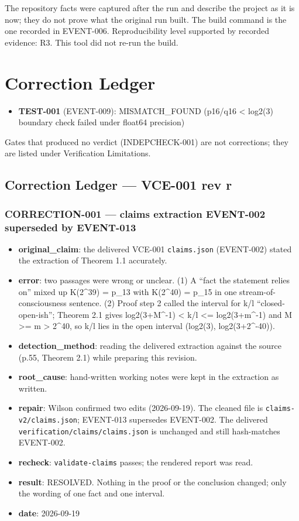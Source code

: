 \documentclass[11pt]{article}
\begin{document}
The repository facts were captured after the run and describe the project as it is now; they do not prove what the original run built. The build command is the one recorded in EVENT-006.
Reproducibility level supported by recorded evidence: R3. This tool did not re-run the build.
\section{Correction Ledger}
\begin{itemize}
\item \textbf{TEST-001} (EVENT-009): MISMATCH\_FOUND (p16/q16 < log2(3) boundary check failed under float64 precision)
\end{itemize}
Gates that produced no verdict (INDEPCHECK-001) are not corrections; they are listed under Verification Limitations.
\subsection*{Correction Ledger --- VCE-001 rev r}
\subsubsection*{CORRECTION-001 --- claims extraction EVENT-002 superseded by EVENT-013}
\begin{itemize}
\item \textbf{original\_claim}: the delivered VCE-001 \texttt{claims.json} (EVENT-002) stated the extraction of Theorem 1.1 accurately.
\item \textbf{error}: two passages were wrong or unclear. (1) A ``fact the statement relies on'' mixed up K(2\textasciicircum{}39) = p\_13 with K(2\textasciicircum{}40) = p\_15 in one stream-of-consciousness sentence. (2) Proof step 2 called the interval for k/l ``closed-open-ish''; Theorem 2.1 gives log2(3+M\textasciicircum{}-1) < k/l <= log2(3+m\textasciicircum{}-1) and M >= m > 2\textasciicircum{}40, so k/l lies in the open interval (log2(3), log2(3+2\textasciicircum{}-40)).
\item \textbf{detection\_method}: reading the delivered extraction against the source (p.55, Theorem 2.1) while preparing this revision.
\item \textbf{root\_cause}: hand-written working notes were kept in the extraction as written.
\item \textbf{repair}: Wilson confirmed two edits (2026-09-19). The cleaned file is \texttt{claims-v2/claims.json}; EVENT-013 supersedes EVENT-002. The delivered \texttt{verification/claims/claims.json} is unchanged and still hash-matches EVENT-002.
\item \textbf{recheck}: \texttt{validate-claims} passes; the rendered report was read.
\item \textbf{result}: RESOLVED. Nothing in the proof or the conclusion changed; only the wording of one fact and one interval.
\item \textbf{date}: 2026-09-19
\end{itemize}
\end{document}
